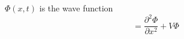 \documentclass[main]{subfiles}
\begin{document}
\begin{theorem}
$\Phi(x,t)$ is the wave function
\[=\frac{\partial^2\Phi}{\partial x^2}+V\Phi\]
\end{theorem}
\end{document}
